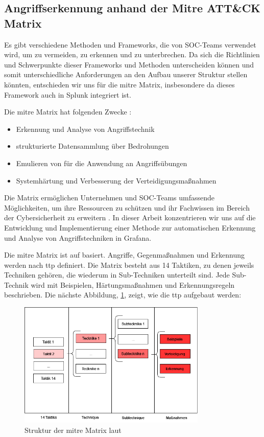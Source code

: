 \subsection{Angriffserkennung anhand der Mitre ATT\&CK Matrix}
Es gibt verschiedene Methoden und Frameworks, die von \gls{SOC}-Teams verwendet wird, um  zu vermeiden, zu erkennen und zu unterbrechen.  Da sich die Richtlinien und Schwerpunkte dieser Frameworks und Methoden unterscheiden können und somit unterschiedliche Anforderungen an den Aufbau unserer Struktur stellen könnten, entschieden wir uns für die \gls{mitre} Matrix, insbesondere da dieses Framework auch in Splunk integriert ist.

Die \gls{mitre} Matrix hat folgenden Zwecke \citep{Mitre_Started}:

{
\begin{itemize}[noitemsep]
   \item Erkennung und Analyse von Angriffstechnik
   \item	strukturierte Datensammlung über Bedrohungen
   \item	Emulieren von  für die Anwendung an Angriffsübungen
   \item	Systemhärtung und Verbesserung der Verteidigungsmaßnahmen
\end{itemize}
}

Die Matrix ermöglichen Unternehmen und \gls{SOC}-Teams umfassende Möglichkeiten, um ihre Ressourcen zu schützen und ihr Fachwissen im Bereich der \gls{Cybersicherheit} zu erweitern \citep{Hazel_howtousemitre}. In dieser Arbeit konzentrieren wir uns auf die Entwicklung und Implementierung einer Methode zur automatischen Erkennung und Analyse von Angriffstechniken in Grafana.

Die \gls{mitre} Matrix ist auf  basiert. Angriffe, Gegenmaßnahmen und Erkennung werden nach \gls{ttp} definiert. Die Matrix besteht aus 14 Taktiken, zu denen jeweils Techniken gehören, die wiederum in Sub-Techniken unterteilt sind. Jede Sub-Technik wird mit Beispielen, Härtungsmaßnahmen und Erkennungsregeln beschrieben. Die nächste Abbildung, \ref{fig:ttp}, zeigt, wie die \gls{ttp} aufgebaut werden:

\begin{figure}[H]
   \centering
   \includegraphics[width=0.8\textwidth]{assets/Mitre_structure.drawio.png}
   \caption[Struktur der \gls{mitre} Matrix]
   {Struktur der \gls{mitre} Matrix laut \cite{Mitre_Started}}
   \label{fig:ttp}
   \centering
\end{figure}

